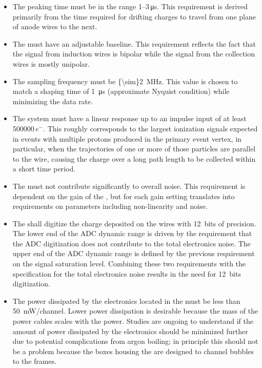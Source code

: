 \begin{itemize}
\item{The  peaking time must  %
be  in the range \numrange{1}{3}\,\si{\micro\second}.  This requirement is derived primarily from the time required for drifting charges to travel from one plane of anode wires to the next.}
\item{The  must %
 have an adjustable baseline.  This requirement reflects the fact that the signal from induction wires is bipolar while the signal from the collection wires is mostly unipolar.}
\item{The  sampling frequency must %
be \SI{{\sim}2}{MHz}.  This value is chosen to match a  shaping time of \SI{1}{\micro\second} (approximate Nyquist condition) while minimizing the data rate.}
\item{The system must have a linear response up to an impulse input of at least \num{500000}\,$e^{-}$.  This roughly corresponds to the largest ionization signals expected in events with multiple protons produced in the primary event vertex, in particular, when the trajectories of one or more of those particles are parallel to the wire, causing the charge over a long path length to be collected within a short time period.}
\item{The  must not contribute significantly to overall  noise. This requirement is dependent on the gain of the , but for each gain setting translates into requirements on  parameters including non-linearity and noise.}
\item{The  shall digitize the charge deposited on the wires with 12~bits of precision.  The lower end of the ADC dynamic range is driven by the requirement that the ADC digitization does not contribute to the total electronics noise. The upper end of the ADC dynamic range is defined by the previous requirement on the signal saturation level. Combining these two requirements with the specification for the total electronics noise results in the need for 12~bits digitization.}
\item{The power dissipated by the electronics located in the \lar must 
be less than \SI{50}{mW/channel}.  Lower power dissipation is desirable because the mass of the power cables scales with the power.  Studies are ongoing to understand if the amount of power dissipated by the electronics should be minimized further due to potential complications from argon boiling; in principle this should not be a problem because the  boxes housing the  are designed to channel bubbles to the  frames.}
\end{itemize}

